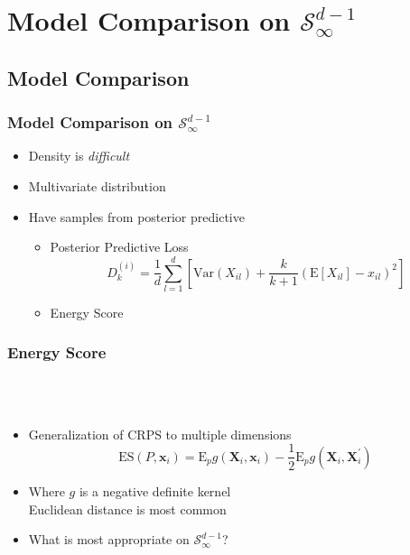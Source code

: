 \documentclass[aspectratio=169]{beamer}
\begin{document}
\section[Model Comparison]{Model Comparison on $\mathcal{S}_{\infty}^{d-1}$}
\subsection{Model Comparison}
\begin{frame}
  \frametitle{Model Comparison on $\mathcal{S}_{\infty}^{d-1}$}
  \begin{itemize}
      \item Density is \emph{difficult}
      \item Multivariate distribution
      \item Have samples from posterior predictive
      \begin{itemize}
            \item Posterior Predictive Loss~\citep{gelfand1998}
                \begin{equation*}
                    D_k^{(i)} = \frac{1}{d}\sum_{l = 1}^{d}\left[\text{Var}(X_{il}) +
                        \frac{k}{k+1}\left(\text{E}[X_{il}] - x_{il}\right)^2\right]
                \end{equation*}
            \item Energy Score~\cite{gneiting2007}
      \end{itemize}
  \end{itemize}
\end{frame}

\begin{frame}
  \frametitle{Energy Score}
  {\scriptsize \citep{gneiting2007}}\\~\vspace{0.2cm}\\
  \begin{itemize}
    \item Generalization of CRPS to multiple dimensions
    \begin{equation*}
      \label{eq:es}
      \text{ES}\left(P,\bm{x}_i\right) =  \text{E}_p g\left(\bm{X}_i, \bm{x}_i\right)
                - \frac{1}{2}\text{E}_p g\left(\bm{X}_i,\bm{X}_i^{\prime}\right)
    \end{equation*}
    \pause
    \item Where $g$ is a negative definite kernel\\
      Euclidean distance is most common
    \pause
    \item What is most appropriate on $\mathcal{S}_{\infty}^{d-1}$?
  \end{itemize}
\end{frame}
\end{document}
